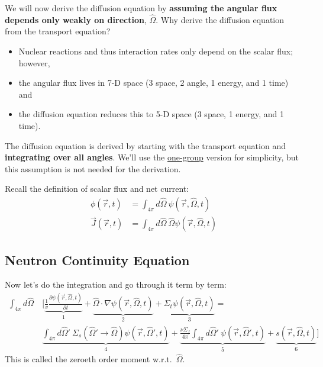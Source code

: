 \documentclass[12pt]{article}
\newlength{\up}
\newcommand{\vOmega}{\ensuremath{\hat{\Omega}}}
\begin{document}
We will now derive the diffusion equation by \textbf{assuming the angular flux depends only weakly on direction}, $\vOmega$. 
%
Why derive the diffusion equation from the transport equation?
\begin{itemize}
\item Nuclear reactions and thus interaction rates only depend on the scalar flux; however,
\item the angular flux lives in 7-D space (3 space, 2 angle, 1 energy, and 1 time) and
\item the diffusion equation reduces this to 5-D space (3 space, 1 energy, and 1 time).
\end{itemize}

The diffusion equation is derived by starting with the transport equation and \textbf{integrating over all angles}. We'll use the \underline{one-group} version for simplicity, but this assumption is not needed for the derivation. 

Recall the definition of scalar flux and net current:
\begin{align*}
\phi(\vec{r}, t) &= \int_{4\pi} d\vOmega \:\psi(\vec{r}, \vOmega, t) \\
\vec{J}(\vec{r}, t) &= \int_{4\pi} d\vOmega \:\vOmega \psi(\vec{r}, \vOmega, t)
\end{align*}

\subsection*{Neutron Continuity Equation}
Now let's do the integration and go through it term by term:
%
\begin{align*}
\int_{4\pi} d\vOmega\: &\biggl[\underbrace{\frac{1}{v}\frac{\partial \psi(\vec{r}, \vOmega, t)}{\partial t}}_{1} + 
\underbrace{\vOmega \cdot \nabla \psi(\vec{r}, \vOmega, t)}_{2} +
\underbrace{\Sigma_t \psi(\vec{r}, \vOmega, t)}_{3} = \nonumber\\
%
&\underbrace{\int_{4\pi} d\vOmega'\: \Sigma_s(\vOmega' \rightarrow \vOmega) \psi(\vec{r}, \vOmega', t)}_{4} 
+ \underbrace{\frac{\nu \Sigma_f}{4\pi} \int_{4\pi} d\vOmega'\: \psi(\vec{r},  \vOmega', t)}_{5}
+ \underbrace{s(\vec{r}, \vOmega, t)}_{6}\biggr]
\end{align*}
%
This is called the zeroeth order moment w.r.t.\ $\vOmega$. 
\end{document}
